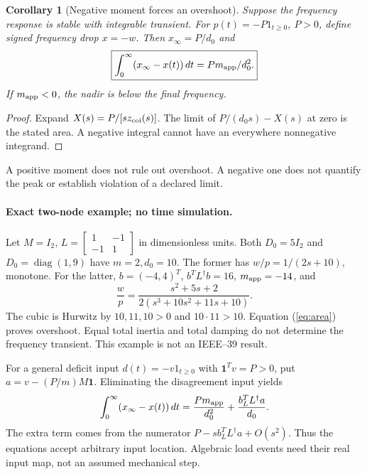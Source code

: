 \documentclass[11pt]{article}
\newtheorem{corollary}[theorem]{Corollary}
\newcommand{\diag}{\operatorname{diag}}
\newcommand{\one}{\mathbf{1}}
\begin{document}
\begin{corollary}[Negative moment forces an overshoot]
Suppose the frequency response is stable with integrable transient.
For $p(t)=-P1_{t\geq0}$, $P>0$, define signed frequency drop $x=-w$.
Then $x_\infty=P/d_0$ and
\begin{equation}
 \boxed{\int_0^\infty(x_\infty-x(t))\,dt=P m_{\rm app}/d_0^2.} \label{eq:area}
\end{equation}
If $m_{\rm app}<0$, the nadir is below the final frequency.
\end{corollary}
\begin{proof}
Expand $X(s)=P/[s z_{\rm coi}(s)]$.
The limit of $P/(d_0s)-X(s)$ at zero is the stated area.
A negative integral cannot have an everywhere nonnegative integrand.
\end{proof}
A positive moment does not rule out overshoot. A negative one does
not quantify the peak or establish violation of a declared limit.

\paragraph{Exact two-node example; no time simulation.}
Let $M=I_2$, $L=\left[\begin{smallmatrix}1&-1\\-1&1\end{smallmatrix}\right]$
in dimensionless units. Both $D_0=5I_2$ and $D_0=\diag(1,9)$ have
$m=2,d_0=10$. The former has $w/p=1/(2s+10)$, monotone.
For the latter, $b=(-4,4)^T$, $b^TL^\dagger b=16$, $m_{\rm app}=-14$,
and
\[
 \frac{w}{p}=\frac{s^2+5s+2}{2(s^3+10s^2+11s+10)}.
\]
The cubic is Hurwitz by $10,11,10>0$ and $10\cdot11>10$.
Equation (\ref{eq:area}) proves overshoot. Equal total inertia and
total damping do not determine the frequency transient.
This example is not an IEEE--39 result.

For a general deficit input $d(t)=-v1_{t\geq0}$ with $\one^Tv=P>0$,
put $a=v-(P/m)M\one$. Eliminating the disagreement input yields
\begin{equation}
 \int_0^\infty(x_\infty-x(t))\,dt
 =\frac{P m_{\rm app}}{d_0^2}+\frac{b_L^TL^\dagger a}{d_0}. \label{eq:location}
\end{equation}
The extra term comes from the numerator $P-s b_L^TL^\dagger a+O(s^2)$.
Thus the equations accept arbitrary input location. Algebraic load
events need their real input map, not an assumed mechanical step.
\end{document}
